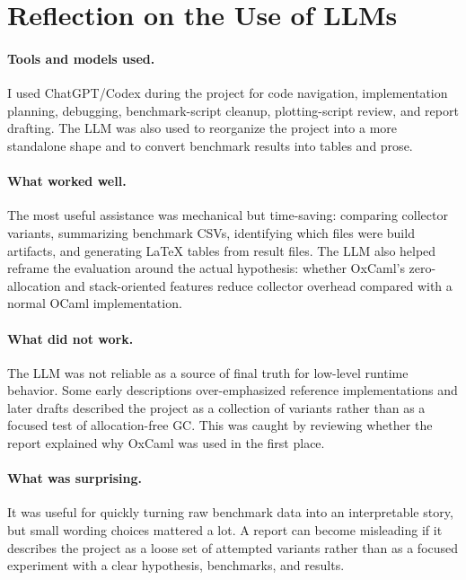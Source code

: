 \documentclass[11pt,a4paper]{article}
\begin{document}
\section{Reflection on the Use of LLMs}
\label{sec:llm}

\paragraph{Tools and models used.}
I used ChatGPT/Codex during the project for code navigation, implementation
planning, debugging, benchmark-script cleanup, plotting-script review, and
report drafting. The LLM was also used to reorganize the project into a more
standalone shape and to convert benchmark results into tables and prose.

\paragraph{What worked well.}
The most useful assistance was mechanical but time-saving: comparing collector
variants, summarizing benchmark CSVs, identifying which files were build
artifacts, and generating LaTeX tables from result files. The LLM also helped
reframe the evaluation around the actual hypothesis: whether OxCaml's
zero-allocation and stack-oriented features reduce collector overhead compared
with a normal OCaml implementation.

\paragraph{What did not work.}
The LLM was not reliable as a source of final truth for low-level runtime
behavior. Some early descriptions over-emphasized reference implementations and
later drafts described the project as a collection of variants rather than as a
focused test of allocation-free GC. This was caught by reviewing whether the
report explained why OxCaml was used in the first place.

\paragraph{What was surprising.}
It was useful for quickly turning raw benchmark data into an interpretable
story, but small wording choices mattered a lot. A report can become misleading
if it describes the project as a loose set of attempted variants rather than as
a focused experiment with a clear hypothesis, benchmarks, and results.
\end{document}
